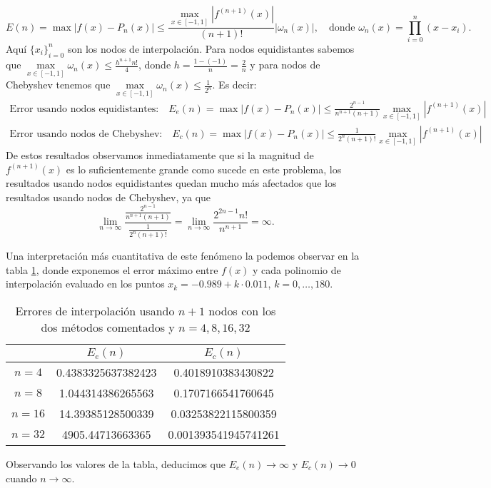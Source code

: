 \documentclass[a4paper]{article}
\begin{document}
\begin{equation}
   E(n)=\max|f(x)-P_n(x)|\leq\frac{\max\limits_{x\in[-1,1]}\left|f^{(n+1)}(x)\right|}{(n+1)!}|\omega_n(x)|,\quad\text{donde }\omega_n(x)=\prod_{i=0}^n(x-x_i).
   \label{eq1}
\end{equation}Aquí $\{x_i\}_{i=0}^n$ son los nodos de interpolación. Para nodos equidistantes sabemos que $\max\limits_{x\in[-1,1]}\omega_n(x)\leq\frac{h^{n+1}n!}{4}$, donde $h=\frac{1-(-1)}{n}=\frac{2}{n}$ y para nodos de Chebyshev tenemos que $\max\limits_{x\in[-1,1]}\omega_n(x)\leq\frac{1}{2^n}$. Es decir: 
\begin{gather*}
    \text{Error usando nodos equidistantes:}\quad E_e(n)=\max|f(x)-P_n(x)|\leq\frac{2^{n-1}}{n^{n+1}(n+1)}\max\limits_{x\in[-1,1]}\left|f^{(n+1)}(x)\right|\\
    \text{Error usando nodos de Chebyshev:}\quad E_c(n)=\max|f(x)-P_n(x)|\leq\frac{1}{2^n(n+1)!}\max\limits_{x\in[-1,1]}\left|f^{(n+1)}(x)\right|
\end{gather*}
De estos resultados observamos inmediatamente que si la magnitud de $f^{(n+1)}(x)$ es lo suficientemente grande como sucede en este problema, los resultados usando nodos equidistantes quedan mucho más afectados que los resultados usando nodos de Chebyshev, ya que $$\lim_{n\to\infty}\frac{\frac{2^{n-1}}{n^{n+1}(n+1)}}{\frac{1}{2^n(n+1)!}}=\lim_{n\to\infty}\frac{2^{2n-1}n!}{n^{n+1}}=\infty.$$\par Una interpretación más cuantitativa de este fenómeno la podemos observar en la tabla \ref{pro1-1}, donde exponemos el error máximo entre $f(x)$ y cada polinomio de interpolación evaluado en los puntos $x_k=-0.989+k\cdot0.011$, $k=0,\ldots,180$.
\begin{table}[ht]
    \centering
    \begin{tabular}{|c|c|c|}
        \hline
        & $E_e(n)$ & $E_c(n)$ \\
        \hline 
        $n=4$ & 0.4383325637382423 & 0.4018910383430822 \\
        \hline
        $n=8$ & 1.044314386265563 & 0.1707166541760645 \\
        \hline
        $n=16$ & 14.39385128500339 & 0.03253822115800359 \\
        \hline
        $n=32$ & 4905.44713663365 & 0.001393541945741261 \\
        \hline
    \end{tabular}
    \caption{Errores de interpolación usando $n+1$ nodos con los dos métodos comentados y $n=4, 8, 16, 32$}
    \label{pro1-1}
\end{table}\par
Observando los valores de la tabla, deducimos que $E_e(n)\to\infty$ y $E_c(n)\to0$ cuando $n\to\infty$.
\newpage
\end{document}

